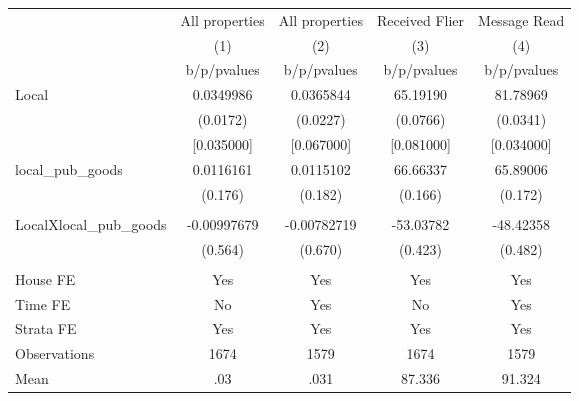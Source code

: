 {
\def\sym#1{\ifmmode^{#1}\else\(^{#1}\)\fi}
\begin{tabular}{l*{4}{c}}
\hline\hline
                &\multicolumn{1}{c}{All properties}&\multicolumn{1}{c}{All properties}&\multicolumn{1}{c}{Received Flier}&\multicolumn{1}{c}{Message Read}\\
                &\multicolumn{1}{c}{(1)}&\multicolumn{1}{c}{(2)}&\multicolumn{1}{c}{(3)}&\multicolumn{1}{c}{(4)}\\
                &b/p/pvalues&b/p/pvalues&b/p/pvalues&b/p/pvalues\\
\hline
Local           &0.0349986&0.0365844& 65.19190& 81.78969\\
                & (0.0172)& (0.0227)& (0.0766)& (0.0341)\\
                &[0.035000]&[0.067000]&[0.081000]&[0.034000]\\
local\_pub\_goods &0.0116161&0.0115102& 66.66337& 65.89006\\
                &  (0.176)&  (0.182)&  (0.166)&  (0.172)\\
                &         &         &         &         \\
LocalXlocal\_pub\_goods&-0.00997679&-0.00782719&-53.03782&-48.42358\\
                &  (0.564)&  (0.670)&  (0.423)&  (0.482)\\
                &         &         &         &         \\
House FE        &      Yes&      Yes&      Yes&      Yes\\
Time FE         &       No&      Yes&       No&      Yes\\
Strata FE       &      Yes&      Yes&      Yes&      Yes\\
\hline
Observations    &     1674&     1579&     1674&     1579\\
Mean            &      .03&     .031&   87.336&   91.324\\
\hline\hline
\end{tabular}
}
